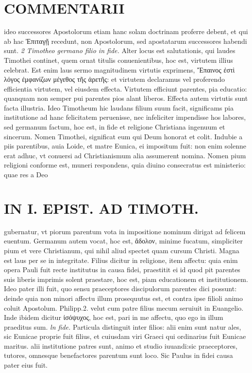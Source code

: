 \documentclass{article}
\begin{document}
\begin{pages}
\section*{COMMENTARII }
\marginpar{[ p.12 ]}\pstart ideo successores Apostolorum etiam hanc solam doctrinam proferre debent, et qui ab hac Ἐπιταγῇ  recedunt, non Apostolorum, sed apostatarum successores habendi sunt.  \pend
\textit{2 Timotheo germano filio in fide. }\pstart Alter locus est salutationis, qui laudes Timothei continet, quem ornat titulis conuenientibus, hoc est, virtutem illius celebrat. Est enim laus sermo magnitudinem virtutis exprimens, Ἔπαινος ἐστὶ λόγος ἐμφανίζων μέγεθος τῆς ἀρετῆς: et virtutem declaramus vel proferendo efficientia virtutem, vel eiusdem effecta. Virtutem efficiunt parentes, pia educatio: quanquam non semper pui parentes pios alant liberos. Effecta autem virtutis sunt facta illustria. Ideo Timotheum hic laudans filium suum facit, significams pia institutione ad hanc felicitatem peruenisse, nec infeliciter impendisse hos labores, sed germanum factum, hoc est, in fide et religione Christiana ingenuum et sincerum.  \pend\pstart Nomen Timothei, significat eum qui Deum honorat et colit. Indubie a piis parentibus, auia Loide, et matre Eunica, ei impositum fuit: non enim solenne erat adhuc, vt conuersi ad Christianismum alia assumerent nomina. Nomen pium religioni conforme est, muneri respondens, quia diuino consecratus est ministerio: quae res a Deo  \pend
\section*{IN I. EPIST. AD TIMOTH. }
\marginpar{[ p.13 ]}\pstart gubernatur, vt piorum parentum vota in impositione nominum dirigat ad felicem euentum.  \pend\pstart Germanum autem vocat, hoc est, ἄδολον, minime fucatum, simpliciter pium et vere Christianum, qui nihil aliud spectet quam cursum Christi. Magna est laus per se in integritate.  \pend\pstart Filius dicitur in religione, item affectu: quia enim opera Pauli fuit recte institutus in causa fidei, praestitit ei id quod pit parentes suis liberis imprimis solent praestare, hoc est, piam educationem et institutionem. Ideo pater illi fuit, quo sensu praeceptores discipulorum parentes dici possunt: deinde quia non minori affectu illum prosequutus est, et contra ipse filioli animo coluit Apostolum. Philipp.2. velut cum patre filius mecum seruiuit in Euangelio. Inde ibidem dicitur ἰσόψυχος, hoc est, pari in me affectu, quo ego in illum praeditus sum.  \pend
\textit{ln fide. }\pstart Particula distinguit inter filios: alii enim sunt natur ales, sic Eunicae proprie fuit filius, et cuiusdam viri Graeci qui ordinarius fuit Eunicae maritus. alii institutione patres sunt, animo et studio iuuandi:sic praeceptores, tutores, omnesque benefactores parentum sunt loco. Sic Paulus in fidei causa pater eius fuit.  \pend

\end{pages}
\end{document}
